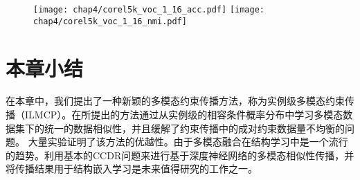\begin{figure}[t]
    \centering
    \texttt{[image: chap4/corel5k\_voc\_1\_16\_acc.pdf]}
    \texttt{[image: chap4/corel5k\_voc\_1\_16\_nmi.pdf]}
	\label{fig4:corel5k_1_10}
\end{figure} 

\section{本章小结}
在本章中，我们提出了一种新颖的多模态约束传播方法，称为实例级多模态约束传播（ILMCP）。在所提出的方法通过从实例级的相容条件概率分布中学习多模态数据集下的统一的数据相似性，并且缓解了约束传播中的成对约束数据量不均衡的问题。
大量实验证明了该方法的优越性。由于多模态融合在结构学习中是一个流行的趋势。利用基本的CCDR问题来进行基于深度神经网络的多模态相似性传播，并将传播结果用于结构嵌入学习是未来值得研究的工作之一。